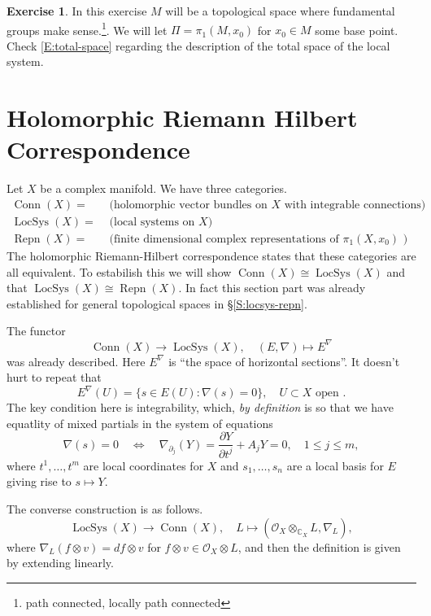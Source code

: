 \documentclass[12pt]{book}
\numberwithin{equation}{section}
\theoremstyle{definition}
\newtheorem{exercise}[theorem]{Exercise}
\theoremstyle{remark}
\newcommand{\CC}{\mathbb{C}}
\newcommand{\Ocal}{\mathcal{O}}
\newcommand{\LocSys}{\operatorname{LocSys}}
\newcommand{\Conn}{\operatorname{Conn}}
\newcommand{\Repn}{\operatorname{Repn}}
\begin{document}
\begin{exercise}\label{EX:total-space}
	In this exercise $M$ will be a topological space where fundamental groups make sense.\footnote{path connected, locally path connected}. 
	We will let $\Pi = \pi_1(M,x_0)$ for $x_0\in M$ some base point.  	
 Check \eqref{E:total-space} regarding the description of the total space of the local system.
\end{exercise}


\section{Holomorphic Riemann Hilbert Correspondence}\label{S:rhc-strat}
Let $X$ be a complex manifold. 
We have three categories.
\begin{align*}
\Conn(X) =& \mbox{ (holomorphic vector bundles on $X$ with integrable connections)} \\
\LocSys(X) =& \mbox{ (local systems on $X$) } \\
\Repn(X) =& \mbox{ (finite dimensional complex representations of $\pi_1(X,x_0)$ )}
\end{align*}
The holomorphic Riemann-Hilbert correspondence states that these categories are all equivalent. 
To estabilish this we will show $\Conn(X) \cong \LocSys(X)$ and that $\LocSys(X) \cong \Repn(X)$. 
In fact this section part was already established for general topological spaces in \S\ref{S:locsys-repn}.

The functor 
$$\Conn(X) \to \LocSys(X), \quad (E,\nabla) \mapsto E^{\nabla}$$ was already described.
Here $E^{\nabla}$ is ``the space of horizontal sections''. 
It doesn't hurt to repeat that 
$$ E^{\nabla}(U) = \lbrace s \in E(U) \colon \nabla(s) =0 \rbrace, \quad U\subset X \mbox{ open }.$$
The key condition here is integrability, which, \emph{by definition} is so that we have equatlity of mixed partials in the system of equations 
$$ \nabla(s)=0 \quad \iff  \quad \nabla_{\partial_j}(Y) = \dfrac{\partial Y}{\partial t^j} + A_j Y =0, \quad 1\leq j \leq m,$$
where $t^1,\ldots,t^m$ are local coordinates for $X$ and $s_1,\ldots,s_n$ are a local basis for $E$ giving rise to $s \mapsto Y$. 

The converse construction is as follows.
$$ \LocSys(X) \to \Conn(X), \quad L \mapsto (\Ocal_X\otimes_{\CC_X} L, \nabla_L),$$
where $\nabla_L(f\otimes v) = df \otimes v$ for $f\otimes v \in \Ocal_X \otimes L$, and then the definition is given by extending linearly.
\end{document}
